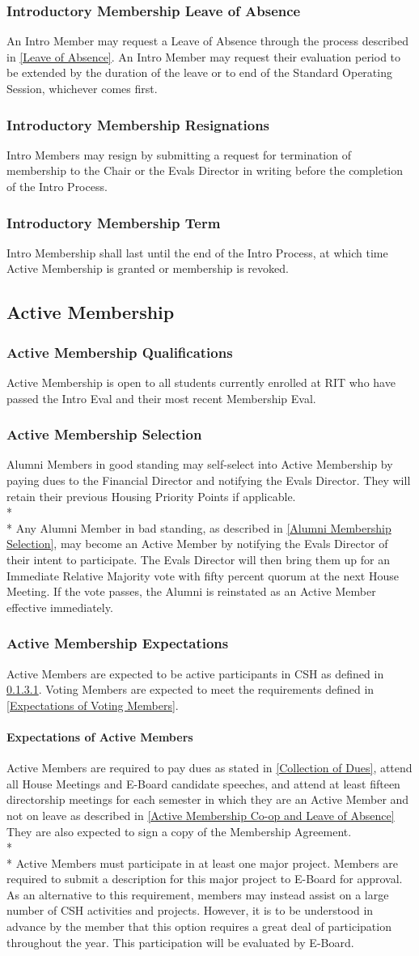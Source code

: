 \documentclass{article}
\newcommand{\asection}[1]{\subsection{#1} \label{#1}}
\newcommand{\asubsection}[1]{\subsubsection{#1} \label{#1}}
\newcommand{\asubsubsection}[1]{\paragraph{#1} \label{#1}}
\begin{document}
\asubsection{Introductory Membership Leave of Absence}
An Intro Member may request a Leave of Absence through the process described in \ref{Leave of Absence}.
An Intro Member may request their evaluation period to be extended by the duration of the leave or to end of the Standard Operating Session, whichever comes first.

\asubsection{Introductory Membership Resignations}
Intro Members may resign by submitting a request for termination of membership to the Chair or the Evals Director in writing before the completion of the Intro Process.

\asubsection{Introductory Membership Term}
Intro Membership shall last until the end of the Intro Process, at which time Active Membership is granted or membership is revoked.

\asection{Active Membership}

\asubsection{Active Membership Qualifications}
Active Membership is open to all students currently enrolled at RIT who have passed the Intro Eval and their most recent Membership Eval.

\asubsection{Active Membership Selection}
Alumni Members in good standing may self-select into Active Membership by paying dues to the Financial Director and notifying the Evals Director. They will retain their previous Housing Priority Points if applicable.
\\*\\*
Any Alumni Member in bad standing, as described in \ref{Alumni Membership Selection}, may become an Active Member by notifying the Evals Director of their intent to participate.
The Evals Director will then bring them up for an Immediate Relative Majority vote with fifty percent quorum at the next House Meeting.
If the vote passes, the Alumni is reinstated as an Active Member effective immediately.

\asubsection{Active Membership Expectations}
Active Members are expected to be active participants in CSH as defined in \ref{Expectations of Active Members}.
Voting Members are expected to meet the requirements defined in \ref{Expectations of Voting Members}.

\asubsubsection{Expectations of Active Members}
Active Members are required to pay dues as stated in \ref{Collection of Dues}, attend all House Meetings and E-Board candidate speeches, and attend at least fifteen directorship meetings for each semester in which they are an Active Member and not on leave as described in \ref{Active Membership Co-op and Leave of Absence}
They are also expected to sign a copy of the Membership Agreement.
\\* \\*
Active Members must participate in at least one major project.
Members are required to submit a description for this major project to E-Board for approval.
As an alternative to this requirement, members may instead assist on a large number of CSH activities and projects.
However, it is to be understood in advance by the member that this option requires a great deal of participation throughout the year.
This participation will be evaluated by E-Board.
\end{document}
